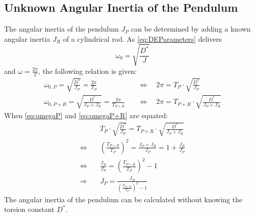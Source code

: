     \subsection{Unknown Angular Inertia of the Pendulum}\label{sec:preparation_task_3}
        The angular inertia of the pendulum \( J_P \) can be determined by adding a known angular inertia \( J_R \) of a cylindrical rod. As \cref{eq:DEParameters} delivers
        \begin{equation}
            \omega_0=\sqrt{\frac{D^*}{J}}
        \end{equation}
        and \( \omega=\frac{2\pi}{T} \), the following relation is given:
        \begin{align}
            \omega_{0,P}=\sqrt{\frac{D^*}{J_P}}=\frac{2\pi}{T_P} \quad              &\Leftrightarrow \quad 2\pi=T_P\cdot\sqrt{\frac{D^*}{J_P}} \label{eq:omegaP} \\
            \omega_{0,P+R}=\sqrt{\frac{D^*}{J_P+J_R}}=\frac{2\pi}{T_{P+R}} \quad    &\Leftrightarrow \quad 2\pi=T_{P+R}\cdot\sqrt{\frac{D^*}{J_P+J_R}} \label{eq:omegaP+R}
        \end{align}
        When \cref{eq:omegaP} and \cref{eq:omegaP+R} are equated:
        \begin{align}
                                    &T_P\cdot\sqrt{\frac{D^*}{J_P}}=T_{P+R}\cdot\sqrt{\frac{D^*}{J_P+J_R}} \nonumber\\
            \Leftrightarrow \quad   &\left( \frac{T_{P+R}}{T_P} \right)^2 =\frac{J_P+J_R}{J_P}=1+\frac{J_R}{J_P} \nonumber\\
            \Leftrightarrow \quad   &\frac{J_R}{J_P}=\left( \frac{T_{P+R}}{T_P} \right)^2-1 \nonumber\\
            \Rightarrow \quad       &J_P=\frac{J_R}{\left( \frac{T_{P+R}}{T_P} \right)^2-1}
        \end{align}
        The angular inertia of the pendulum can be calculated without knowing the torsion constant \( D^* \).
